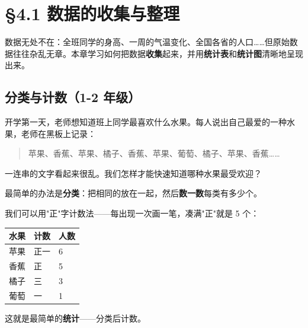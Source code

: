 \chapter{§4.1 数据的收集与整理}
\label{sec:4.1}





数据无处不在：全班同学的身高、一周的气温变化、全国各省的人口……但原始数据往往杂乱无章。本章学习如何把数据\textbf{收集}起来，并用\textbf{统计表}和\textbf{统计图}清晰地呈现出来。



\section*{分类与计数（1-2 年级）}


\begin{explore}


开学第一天，老师想知道班上同学最喜欢什么水果。每人说出自己最爱的一种水果，老师在黑板上记录：

\end{explore}

\begin{quote}
苹果、香蕉、苹果、橘子、香蕉、苹果、葡萄、橘子、苹果、香蕉……
\end{quote}


一连串的文字看起来很乱。我们怎样才能快速知道哪种水果最受欢迎？

\begin{understand}


最简单的办法是\textbf{分类}：把相同的放在一起，然后\textbf{数一数}每类有多少个。

我们可以用"正"字计数法——每出现一次画一笔，凑满"正"就是 5 个：

\begin{center}
\begin{tabular}{lll}
\toprule
水果 & 计数 & 人数 \\
\midrule
苹果 & 正一 & 6 \\
香蕉 & 正 & 5 \\
橘子 & 三 & 3 \\
葡萄 & 一 & 1 \\
\bottomrule
\end{tabular}
\end{center}


这就是最简单的\textbf{统计}——分类后计数。

\end{understand}


